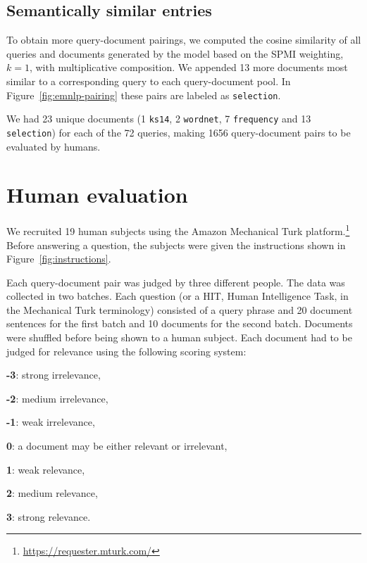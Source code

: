 \subsection{Semantically similar entries}

To obtain more query-document pairings, we computed the cosine similarity of all queries and documents generated by the model based on  the SPMI weighting, $k=1$, with multiplicative composition. We appended 13 more documents most similar to a corresponding query to each query-document pool. In Figure~\ref{fig:emnlp-pairing} these pairs are labeled as \texttt{selection}.

We had 23 unique documents (1 \texttt{ks14}, 2 \texttt{wordnet}, 7
\texttt{frequency} and 13 \texttt{selection}) for each of the 72 queries, making
1656 query-document pairs to be evaluated by humans.

\section{Human evaluation}
\label{sec:human-evaluation}



We recruited 19 human subjects using the Amazon Mechanical Turk platform.\footnote{\url{https://requester.mturk.com/}} Before answering a question, the subjects were given the instructions shown in Figure~\ref{fig:instructions}.

Each query-document pair was judged by three different people. The data was collected in two batches. Each question (or a HIT, Human Intelligence Task, in the Mechanical Turk terminology) consisted of a query phrase and 20 document sentences for the first batch and 10 documents for the second batch. Documents were shuffled before being shown to a human subject. Each document had to be judged for relevance using the following scoring system:
\begin{compactitem}
\item \textbf{-3}: strong irrelevance,
\item \textbf{-2}: medium irrelevance,
\item \textbf{-1}: weak irrelevance,
\item  \textbf{0}: a document may be either relevant or irrelevant,
\item  \textbf{1}: weak relevance,
\item  \textbf{2}: medium relevance,
\item  \textbf{3}: strong relevance.
\end{compactitem}

